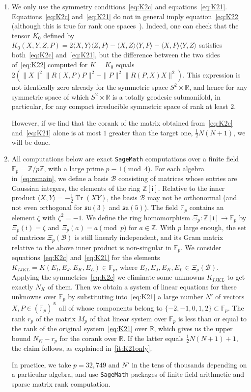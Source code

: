 \documentclass[12pt,reqno]{amsart}
\newcommand \br{\mathbb{R}}
\newcommand \Z{\mathbb{Z}}
\newcommand \F{\mathbb{F}}
\newcommand \Tr{\operatorname{Tr}}
\newcommand \cB{\mathcal{B}}
\newcommand \su{\mathfrak{su}}
\newcommand \ir{\mathrm{i}}
\newcommand \<{\langle}
\renewcommand \>{\rangle}
\theoremstyle{definition}
\theoremstyle{remark}
\begin{document}
\begin{enumerate}[label=(\Roman*),ref=\Roman*]
     \item \label{it:K21only}
     We only use the symmetry conditions~\eqref{eq:K2c} and equations~\eqref{eq:K21}. Equations~\eqref{eq:K2c} and~\eqref{eq:K21} do not in general imply equation~\eqref{eq:K22} (although this is true for rank one spaces~\cite[Corollary~3]{MN2}). Indeed, one can check that the tensor $K_0$ defined by $K_0(X,Y,Z,P)= 2\< X, Y\> \< Z,P\>-\< X,Z\>\< Y,P\>-\< X,P\>\< Y,Z\>$ satisfies both~\eqref{eq:K2c} and~\eqref{eq:K21}, but the difference between the two sides of~\eqref{eq:K22} computed for $K=K_0$ equals $2(\|X\|^2 \|R(X,P)P\|^2-\|P\|^2\|R(P,X)X\|^2)$. This expression is not identically zero already for the symmetric space $S^2 \times \br$, and hence for any symmetric space of which $S^2 \times \br$ is a totally geodesic submanifold, in particular, for any compact irreducible symmetric space of rank at least $2$.

     However, if we find that the corank of the matrix obtained from~\eqref{eq:K2c} and~\eqref{eq:K21} alone is at most $1$ greater than the target one, $\frac12 N (N+1)$, we will be done.

     \item \label{it:Fp}
     All computations below are exact \texttt{SageMath} computations over a finite field $\F_p = \Z/p \Z$, with a large prime $p \equiv 1 \pmod 4$. For each algebra in~\eqref{eq:remain}, we define a basis $\cB$ consisting of matrices whose entries are Gaussian integers, the elements of the ring $\Z[\ir]$. Relative to the inner product $\<X, Y\> = -\frac12 \Tr(XY)$, the basis $\cB$ may not be orthonormal (and not even orthogonal for $\su(3)$ and $\su(5)$). The field $\F_p$ contains an element $\zeta$ with $\zeta^2 = -1$. We define the ring homomorphism $\Xi_p: \Z[\ir] \to \F_p$ by $\Xi_p(\ir) =  \zeta$ and $\Xi_p(a) = a \pmod p$ for $a \in \Z$. With $p$ large enough, the set of matrices $\Xi_p(\cB)$ is still linearly independent, and its Gram matrix relative to the above inner product is non-singular in $\F_p$. We consider equations~\eqref{eq:K2c} and~\eqref{eq:K21} for the elements $K_{IJKL}=K(E_I,E_J,E_K,E_L) \in \F_p$, where $E_I,E_J,E_K,E_L \in \Xi_p(\cB)$. Applying the symmetries~\eqref{eq:K2c} we eliminate some unknowns $K_{IJKL}$ to get exactly $N_K$ of them. Then we obtain a system of linear equations for these unknowns over $\F_p$ by substituting into~\eqref{eq:K21} a large number $N'$ of vectors $X,P \in (\F_p)^N$ all of whose components belong to $\{-2,-1,0,1,2\} \subset \F_p$. The rank $r_p$ of the matrix $M_p$ of that linear system over $\F_p$ is less than or equal to the rank of the original system~\eqref{eq:K21} over $\br$, which gives us the upper bound $N_K - r_p$ for the corank over $\br$. If the latter equals $\frac12 N (N+1) + 1$, the claim follows, as explained in~\eqref{it:K21only}.

     In practice, we take $p=32,749$ and $N'$ in the tens of thousands depending on a particular algebra, and use \texttt{SageMath} packages of finite field arithmetic and sparse matrix rank computation.
\end{enumerate}
\end{document}
